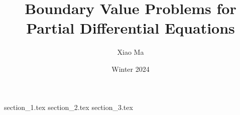 \documentclass{article}
\title{Boundary Value Problems for Partial Differential Equations}
\author{Xiao Ma}
\date{Winter 2024}
\theoremstyle{remark}
\numberwithin{equation}{section}
\begin{document}
\maketitle

{section_1.tex}
{section_2.tex}
{section_3.tex}
\end{document}
